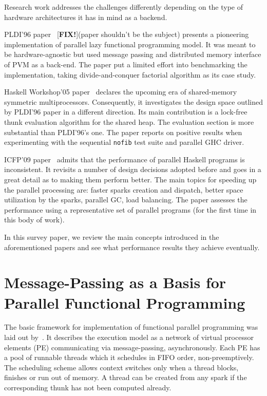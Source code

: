 \documentclass[11pt]{extarticle}
\newcommand{\fix}{[{\color{red}\bf FIX!}]\xspace}
\begin{document}
Research work addresses the challenges differently depending on the type of hardware architectures it has in mind as a backend.

PLDI'96 paper~\cite{Trinder96} \fix (paper shouldn't be the subject) presents a pioneering implementation of parallel lazy functional programming model. It was meant to be hardware-agnostic but used message passing and distributed memory interface of PVM as a back-end. The paper put a limited effort into benchmarking the implementation, taking divide-and-conquer factorial algorithm as its case study.

Haskell Workshop'05 paper~\cite{Harris05} declares the upcoming era of shared-memory symmetric multiprocessors. Consequently, it investigates the design space outlined by PLDI'96 paper in a different direction. Its main contribution is a lock-free thunk evaluation algorithm for the shared heap. The evaluation section is more substantial than PLDI'96's one. The paper reports on positive results when experimenting with the sequential \texttt{nofib} test suite and parallel GHC driver.

ICFP'09 paper~\cite{Marlow09} admits that the performance of parallel Haskell programs is inconsistent. It revisits a number of design decisions adopted before and goes in a great detail as to making them perform better. The main topics for speeding up the parallel processing are: faster sparks creation and dispatch, better space utilization by the sparks, parallel GC, load balancing. The paper assesses the performance using a representative set of parallel programs (for the first time in this body of work).

In this survey paper, we review the main concepts introduced in the aforementioned papers and see what performance results they achieve eventually.

\section{Message-Passing as a Basis for Parallel Functional Programming}

The basic framework for implementation of functional parallel programming was laid out by~\cite{Trinder96}. It describes the execution model as a network of virtual processor elements (PE) communicating via message-passing, asynchronously. Each PE has a pool of runnable threads which it schedules in FIFO order, non-preemptively. The scheduling scheme allows context switches only when a thread blocks, finishes or run out of memory. A thread can be created from any spark if the corresponding thunk has not been computed already. 
\end{document}
